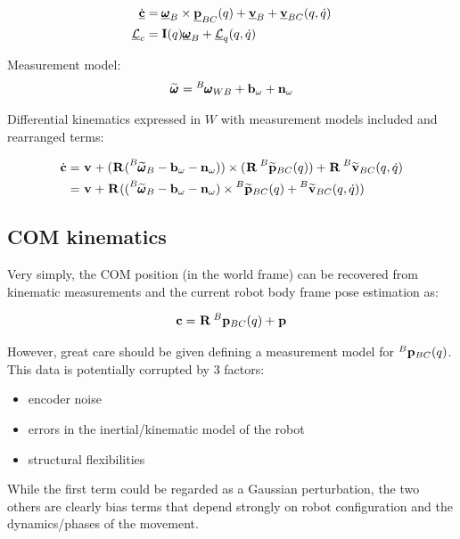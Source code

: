 \documentclass[11pt]{article}
\newcommand{\Rot}[2]{\prescript{#1}{}{\bfR}_{#2}}
\newcommand{\noise}{\bfn}
\newcommand{\posiv}[1]{\underline{\bfp}_{#1}}
\newcommand{\posi}[2]{\prescript{#1}{}{\bfp}_{#2}}
\newcommand{\posim}[2]{\prescript{#1}{}{\widetilde{\bfp}}_{#2}}
\newcommand{\velv}[1]{\underline{\bfv}_{#1}}
\newcommand{\vel}[2]{\prescript{#1}{}{\bfv}_{#2}}
\newcommand{\velm}[2]{\prescript{#1}{}{\widetilde{\bfv}}_{#2}}
\newcommand{\angvelv}[1]{\underline{\pmb{\omega}}_{#1}}
\newcommand{\angvel}[2]{\prescript{#1}{}{\pmb{\omega}}_{#2}}
\newcommand{\angvelm}[2]{\prescript{#1}{}{\widetilde{\pmb{\omega}}}_{#2}}
\newcommand{\AM}{\mathcal{L}}
\newcommand{\AMv}{\underline{\mathcal{L}}}
\newcommand{\COM}{\bfc}
\newcommand{\COMv}{\underline{\bfc}}
\begin{document}
\begin{equation}
\begin{split}
\dot{\COMv} &= \angvelv{B} \times \posiv{BC}(q) + \velv{B} + \velv{BC}(q,\dot{q}) 
\\
\AMv_c &= \bfI(q) \angvelv{B} + \AMv_q (q,\dot{q})   
\end{split}
\end{equation}

Measurement model:
\begin{align}
    \angvelm{}{} = \angvel{B}{WB} + \bfb_{\omega} + \noise_{\omega}
\end{align}

Differential kinematics expressed in $W$ with measurement models included and rearranged terms:

\begin{equation}
\begin{split}
\dot{\COM} &= \vel{}{} + (\Rot{}{}(\angvelm{B}{B} - \bfb_{\omega} - \noise_{\omega})) \times (\Rot{}{}\posim{B}{BC}(q)) + \Rot{}{}\velm{B}{BC}(q,\dot{q}) 
\\
&= \vel{}{} + \Rot{}{}((\angvelm{B}{B} - \bfb_{\omega} - \noise_{\omega}) \times \posim{B}{BC}(q) + \velm{B}{BC}(q,\dot{q}))
\\
\end{split}
\end{equation}

\subsection{COM kinematics}
Very simply, the COM position (in the world frame) can be recovered from kinematic measurements and the current robot body frame pose estimation as:

\begin{equation}
    \COM = \Rot{}{} \posi{B}{BC}(q) + \posi{}{}
\end{equation}

However, great care should be given defining a measurement model for \(\posi{B}{BC}(q)\). This data is potentially corrupted by 3 factors:
\begin{itemize}
    \item encoder noise
    \item errors in the inertial/kinematic model of the robot
    \item structural flexibilities
\end{itemize}

While the first term could be regarded as a Gaussian perturbation, the two others are clearly bias terms that depend strongly on robot configuration and the dynamics/phases of the movement.  
\end{document}
